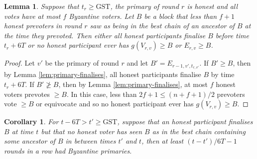 \documentclass{article}
\newtheorem{lemma}[theorem]{Lemma}
\newtheorem{corollary}[theorem]{Corollary}
\def\GST{\mathrm{GST}}
\begin{document}
\begin{lemma} \label{lem:honest-recent-validity}
Suppose that $t_r \geq \GST$, the primary of round $r$ is honest and all votes have at most $f$ Byzantine voters.
Let $B$ be a block that less than $f+1$ honest prevoters in round $r$ saw as being in the best chain of an ancestor of $B$ at the time they prevoted.
Then either all honest participants finalise $B$ before time $t_r+6T$ or no honest participant ever has $g(V_{r,v}) \geq B$ or $E_{r,v} \geq B$.
\end{lemma}

\begin{proof} Let $v'$ be the primary of round $r$ and let $B'=E_{r-1,v',t_{r,v'}}$. If $B' \geq B$, then by Lemma \ref{lem:primary-finalises}, all honest participants finalise $B$ by time $t_r+6T$. If $B' \not\geq B$, then by Lemma \ref{lem:primary-finalises}, at most $f$ honest voters prevotes $\geq B$. In this case, less than $2f+1 \leq (n+f+1)/2$ prevoters vote $\geq B$ or equivocate and so no honest participant ever has $g(V_{r,v}) \geq B$.
\end{proof}


\begin{corollary} For $t - 6T > t' \geq \GST$, suppose that an honest participant finalises $B$ at time $t$ but that no honest voter has seen $B$ as in the best chain containing some ancestor of $B$ in between times $t'$ and $t$, then at least $(t-t')/6T - 1$ rounds in a row had Byzantine primaries. \end{corollary}



\end{document}
